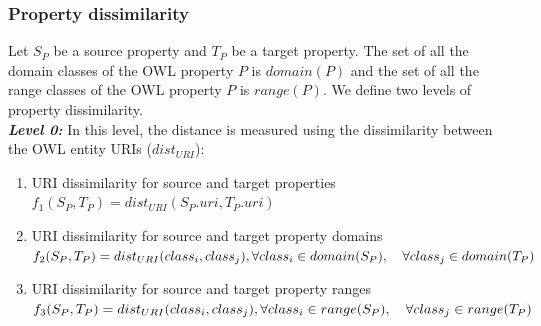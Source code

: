 \documentclass{IOS-Book-Article}
\begin{document}
\subsubsection{Property dissimilarity}
Let $S_P$ be a source property and $T_P$ be a target property. The set of all the domain classes of the OWL property $P$ is $domain(P)$ and the set of all the range classes of the OWL property $P$ is $range(P)$. We define two levels of property dissimilarity.\\
\indent\textit{\textbf{Level 0:}} In this level, the distance is measured using the dissimilarity between the OWL entity URIs ($dist_{URI}$):
\begin{enumerate}
    \item URI dissimilarity for source and target properties 
    \\ $f_1(S_P, T_P)= dist_{URI}(S_P.{uri}, T_P.{uri})$

    \item URI dissimilarity for source and target property domains
    \\ $f_2(S_P, T_P)= dist_{URI}(class_i, class_j ), 
    \\ \forall class_i \in domain(S_P),\quad\forall class_j \in domain(T_P)$

    \item URI dissimilarity for source and target property ranges
    \\ $f_3(S_P, T_P)= dist_{URI}(class_i, class_j ),
    \\ \forall class_i \in range(S_P),\quad\forall class_j \in range(T_P)$
\end{enumerate}
\end{document}
